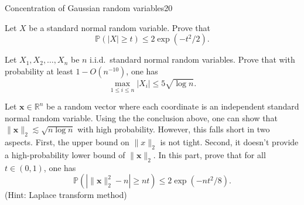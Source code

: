\documentclass{article}
\begin{document}




\begin{problem}{Concentration of Gaussian random variables}{20}

Let $X$ be a standard normal random variable. Prove that 
\[
\mathbb{P} ( |X| \geq t) \leq 2 \exp(- t^2 / 2). 
\]

Let $X_1, X_2, \ldots, X_n$ be $n$ i.i.d.~standard normal random variables. Prove that with probability at least $1- O(n^{-10})$, one has
\[
\max_{1 \leq i \leq n}  |X_i|  \leq 5 \sqrt{\log n}.
\]

Let $\bm{x} \in \mathbb{R}^{n}$ be a random vector where each coordinate is an independent standard normal random variable. Using the the conclusion above, one can show that $\|\bm{x}\|_{2} \lesssim \sqrt{n \log n}$ with high probability. However, this falls short in two aspects. First, the upper bound on $\|x\|_2$ is not tight. Second, it doesn't provide a high-probability lower bound of $\|\bm{x}\|_2$. In this part, prove that for all $t \in (0,1)$, one has
\[
\mathbb{P}( | \| \bm{x} \|_{2}^2 - n | \geq nt) \leq 2 \exp(-nt^2 / 8).
\]
(Hint: Laplace transform method)
\end{problem}
\end{document}
